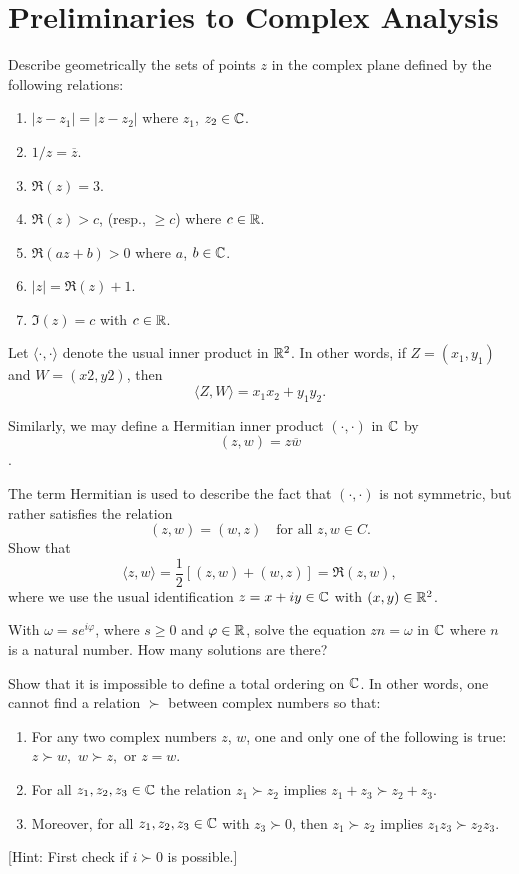 \section{Preliminaries to Complex Analysis}

\begin{exercise}
Describe geometrically the sets of points $z$ in the complex plane defined by the
following relations:
\begin{enumerate}[label=(\alph*)]
    \item $|z - z_1| = |z - z_2|$ where $z_1$, $z_2 \in \mathbb{C}$.
    \item $1/z = \overline{z}$.
    \item $\Re(z) = 3$.
    \item $\Re(z) > c$, (resp., $\geq c$) where $c \in \mathbb{R}$.
    \item $\Re(az + b) > 0$ where $a$, $b \in \mathbb{C}$.
    \item $|z| = \Re(z) + 1$.
    \item $\Im(z) = c$ with $c \in \mathbb{R}$.
\end{enumerate}

\end{exercise}


\begin{exercise}
Let $\langle \cdot, \cdot\rangle$ denote the usual inner product in $\mathbb{R}^2$. In other words, if $Z = (x_1, y_1)$ and $W = (x2, y2)$, then $$\langle Z,W\rangle = x_1x_2 + y_1y_2.$$

Similarly, we may define a Hermitian inner product $(\cdot, \cdot)$ in $\mathbb{C}$ by
$$(z, w) = z\overline{w}$$.

The term Hermitian is used to describe the fact that $(\cdot, \cdot)$ is not symmetric, but rather satisfies the relation
$$(z, w) = (w, z) \quad \text{for all } z, w \in C.$$
Show that $$\langle z, w\rangle = \frac{1}{2}[(z,w)+(w,z)]=\Re(z,w),$$ where we use the usual identification $z = x + iy \in \mathbb{C}$ with $(x, y) \in \mathbb{R}^2$.
\end{exercise}

\begin{exercise}
With $\omega = se^{i\varphi}$, where $s\geq0$ and $\varphi\in\mathbb{R}$, solve the equation $zn = \omega$ in $\mathbb{C}$ where $n$ is a natural number. How many solutions are there?
\end{exercise}

\begin{exercise}
Show that it is impossible to define a total ordering on $\mathbb{C}$. In other words, one cannot find a relation $\succ$ between complex numbers so that:
\begin{enumerate}[label=(\roman*)]
\item For any two complex numbers $z$, $w$, one and only one of the following is true: $z \succ w,$ $w \succ z,$ or $z = w$.
\item For all $z_1, z_2, z_3 \in \mathbb{C}$ the relation $z_1 \succ z_2$ implies $z_1 + z_3 \succ z_2 + z_3.$
\item Moreover, for all $z_1, z_2, z_3 \in \mathbb{C}$ with $z_3 \succ 0$, then $z_1 \succ z_2$ implies $z_1z_3 \succ z_2z_3$.
\end{enumerate}
[Hint: First check if $i \succ 0$ is possible.]
\end{exercise}

